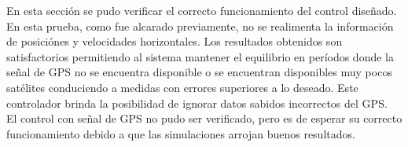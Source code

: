 \documentclass[main]{subfiles}
\begin{document}
En esta secci\'on se pudo verificar el correcto funcionamiento del control diseñado. En esta prueba, como fue alcarado previamente, no se realimenta la informaci\'on de posici\'ones y velocidades horizontales. Los resultados obtenidos son satisfactorios permitiendo al sistema mantener el equilibrio en per\'iodos donde la señal de GPS no se encuentra disponible o se encuentran disponibles muy pocos sat\'elites conduciendo a medidas con errores superiores a lo deseado. Este controlador brinda la posibilidad de ignorar datos sabidos incorrectos del GPS.\\

El control con señal de GPS no pudo ser verificado, pero es de esperar su correcto funcionamiento debido a que las simulaciones arrojan buenos resultados.
\end{document}
